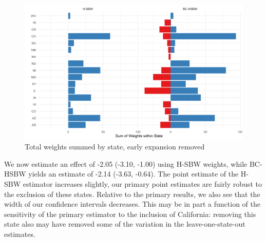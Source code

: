 \documentclass[aoas]{imsart}
\theoremstyle{plain}
\theoremstyle{remark}
\begin{document}
\begin{figure}[H]
\begin{center}
    \caption{Total weights summed by state, early expansion removed}
    \label{fig:weightsbystatec2}
    \includegraphics[scale=0.6]{01_Plots/weights-by-state-hsbw-c2.png}
\end{center}
\end{figure}

We now estimate an effect of -2.05 (-3.10, -1.00) using H-SBW weights, while BC-HSBW yields an estimate of -2.14 (-3.63, -0.64). The point estimate of the H-SBW estimator increases slightly, our primary point estimates are fairly robust to the exclusion of these states. Relative to the primary results, we also see that the width of our confidence intervals decreases. This may be in part a function of the sensitivity of the primary estimator to the inclusion of California: removing this state also may have removed some of the variation in the leave-one-state-out estimates. 
\end{document}
